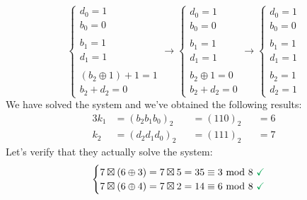 \begin{equation*}
    \begin{cases}
        
        d_0=1\\
        b_0=0\\\\
        
        b_1=1\\
        d_1=1\\\\
        
        (b_2\oplus1)+1=1\\
        b_2+d_2=0
        
    \end{cases}\longrightarrow
    \begin{cases}
        
        d_0=1\\
        b_0=0\\\\
        
        b_1=1\\
        d_1=1\\\\
        
        b_2\oplus1=0\\
        b_2+d_2=0
        
    \end{cases}\longrightarrow
    \begin{cases}
        
        d_0=1\\
        b_0=0\\\\
        
        b_1=1\\
        d_1=1\\\\
        
        b_2=1\\
        d_2=1
        
    \end{cases}
\end{equation*}
We have solved the system and we've obtained the following results:
\begin{alignat*}{3}
    k_1&=(b_2b_1b_0)_2&&=(110)_2&&=6\\
    k_2&=(d_2d_1d_0)_2&&=(111)_2&&=7
\end{alignat*}
Let's verify that they actually solve the system:
\begin{equation*}
    \begin{cases}
        7\boxtimes(6\oplus3)=7\boxtimes5=35\equiv3\mymod8\text{ \textcolor{Green}{\checkmark}}\\
        7\boxtimes(6\oplus4)=7\boxtimes2=14\equiv6\mymod8\text{ \textcolor{Green}{\checkmark}}
    \end{cases}
\end{equation*}
